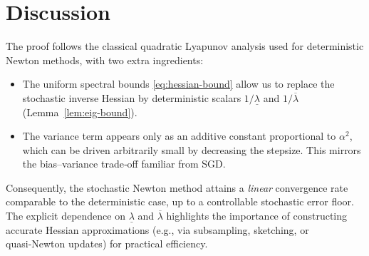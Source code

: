\documentclass{article}
\begin{document}
\section*{Discussion}
The proof follows the classical quadratic Lyapunov analysis used for deterministic Newton methods, with two extra ingredients:
\begin{itemize}
\item The uniform spectral bounds \eqref{eq:hessian-bound} allow us to replace the stochastic inverse Hessian by deterministic scalars $1/\underline{\lambda}$ and $1/\overline{\lambda}$ (Lemma~\ref{lem:eig-bound}).
\item The variance term appears only as an additive constant proportional to $\alpha^{2}$, which can be driven arbitrarily small by decreasing the stepsize. This mirrors the bias–variance trade‑off familiar from SGD.
\end{itemize}
Consequently, the stochastic Newton method attains a \emph{linear} convergence rate comparable to the deterministic case, up to a controllable stochastic error floor. The explicit dependence on $\underline{\lambda}$ and $\overline{\lambda}$ highlights the importance of constructing accurate Hessian approximations (e.g., via subsampling, sketching, or quasi‑Newton updates) for practical efficiency.
\end{document}
